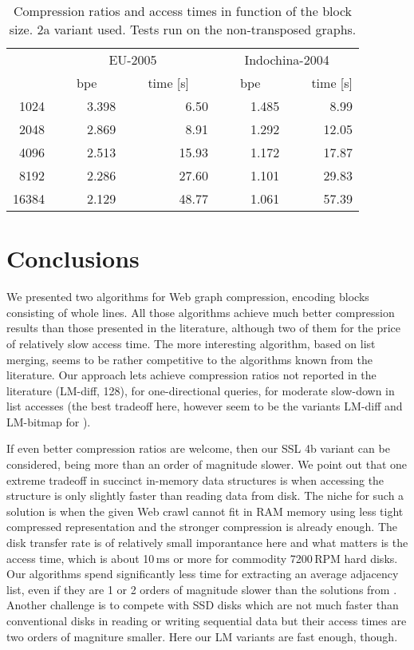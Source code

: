 \documentclass[envcountsame]{llncs}
\begin{document}
\begin{table}
\centering
\begin{tabular}{rrrrr}
\hline
 & \multicolumn{2}{c}{EU-2005} &  \multicolumn{2}{c}{Indochina-2004}  \\
      ~~~&~~~bpe~~~&~~~time [s]~~~&~~~bpe~~~&~~~time [s] \\ 
\hline
1024 & 3.398 & 6.50 & 1.485 & 8.99 \\
2048 & 2.869 & 8.91 & 1.292 & 12.05 \\
4096 & 2.513 & 15.93 & 1.172 & 17.87 \\
8192 & 2.286 & 27.60 & 1.101 & 29.83 \\
16384 & 2.129 & 48.77 & 1.061 & 57.39 \\
\hline
\end{tabular}
\vspace{4mm}
\caption{Compression ratios and access times in function of the block size. 
2a variant used. Tests run on the non-transposed graphs.}
\label{table:blocks}
\end{table}


\section{Conclusions}


We presented two algorithms for Web graph compression, encoding blocks 
consisting of whole lines. 
All those algorithms achieve much better compression results than those 
presented in the literature, although two of them for the price of relatively slow 
access time. 
The more interesting algorithm, based on list merging, seems to be rather competitive 
to the algorithms known from the literature. 
Our approach lets achieve compression ratios not reported in the literature (LM-diff, 128), 
for one-directional queries, for moderate slow-down in list accesses
(the best tradeoff here, however seem to be the variants LM-diff and LM-bitmap 
for ).

If even better compression ratios are welcome, then our SSL 4b variant can be 
considered, being more than an order of magnitude slower.
We point out that one extreme tradeoff in succinct in-memory data 
structures is when accessing the structure is only slightly faster than reading data 
from disk. The niche for such a solution is when the given Web crawl 
cannot fit in RAM memory using less tight compressed representation 
and the stronger compression is already enough.
The disk transfer rate is of relatively small imporantance here 
and what matters is the access time, which is about 10\,ms or more for commodity 
7200\,RPM hard disks.
Our algorithms spend significantly less time for extracting an average adjacency list, 
even if they are 1 or 2 orders of magnitude slower than the solutions from 
\cite{DBLP:conf/www/BoldiV04,CNtr08,DBLP:conf/birthday/ClaudeN10}.
Another challenge is to compete with SSD disks which are not much faster 
than conventional disks in reading or writing sequential data but their access 
times are two orders of magniture smaller. Here our LM variants are fast enough, though. 
\end{document}

